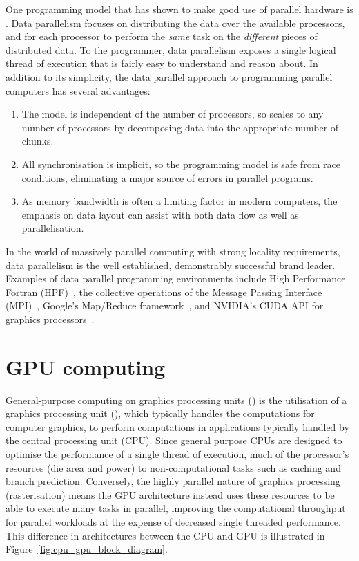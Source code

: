 One programming model that has shown to make good use of parallel hardware is
.
Data parallelism focuses on distributing the data over the available processors,
and for each processor to perform the \emph{same} task on the \emph{different}
pieces of distributed data. To the programmer, data parallelism exposes a single
logical thread of execution that is fairly easy to understand and reason about.
In addition to its simplicity, the data parallel approach to programming
parallel computers has several advantages:
%
\begin{enumerate}
\item The model is independent of the number of processors, so scales to any
    number of processors by decomposing data into the appropriate number of
    chunks.

\item All synchronisation is implicit, so the programming model is safe from
    race conditions, eliminating a major source of errors in parallel programs.

\item As memory bandwidth is often a limiting factor in modern computers, the
    emphasis on data layout can assist with both data flow as well as
    parallelisation.
\end{enumerate}
%
In the world of massively parallel computing with strong locality requirements,
data parallelism is the well established, demonstrably successful brand leader.
Examples of data parallel programming environments include High Performance
Fortran (HPF)~\cite{HPF:1997}, the collective operations of the Message Passing
Interface (MPI)~\cite{MPI:2012}, Google's Map/Reduce
framework~\cite{Dean:2008fi}, and NVIDIA's CUDA API for graphics
processors~\cite{NVIDIA:2012wf}.


\section{GPU computing} %
\label{sec:gpu_computing}

General-purpose computing on graphics processing units
() is the utilisation of a graphics processing unit (\GPU),
which typically handles the computations for computer graphics, to perform
computations in applications typically handled by the central processing unit
(CPU). Since general purpose CPUs are designed to optimise the performance of a
single thread of execution, much of the processor's resources (die area and
power) to non-computational tasks such as caching and branch prediction.
Conversely, the highly parallel nature of graphics processing (rasterisation)
means the GPU architecture instead uses these resources to be able to execute
many tasks in parallel, improving the computational throughput for parallel
workloads at the expense of decreased single threaded performance. This
difference in architectures between the CPU and GPU is illustrated in
Figure~\ref{fig:cpu_gpu_block_diagram}.

